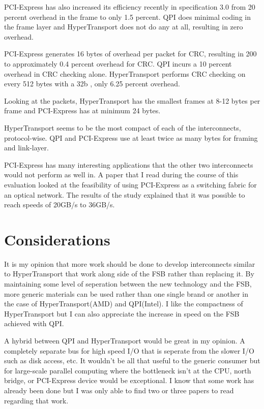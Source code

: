 \documentclass[conference]{IEEEtran}
\begin{document}
PCI-Express has also increased its efficiency recently in specification 3.0 from
20 percent overhead in the frame to only 1.5 percent. QPI does minimal coding in
the frame layer and HyperTransport does not do any at all, resulting in zero
overhead.

PCI-Express generates 16 bytes of overhead per packet for CRC, resulting in 200
to approximately 0.4 percent overhead for CRC. QPI incurs a 10
percent overhead in CRC checking alone. HyperTransport performs CRC checking on
every 512 bytes with a 32b , only 6.25 percent overhead. 

Looking at the packets, HyperTransport has the smallest frames at 8-12 bytes per
frame and PCI-Express has at minimum 24 bytes. 

HyperTransport seems to be the most compact of each of the interconnects,
protocol-wise. QPI and PCI-Express use at least twice as many bytes for framing
and link-layer. 

PCI-Express has many interesting applications that the other two interconnects
would not perform as well in. A paper that I read during the course of this
evaluation looked at the feasibility of using PCI-Express as a switching fabric
for an optical network. The results of the study explained that it was possible
to reach speeds of 20GB/s to 36GB/s.\cite{gray2007co}

\section{Considerations}
It is my opinion that more work should be done to develop interconnects similar
to HyperTransport that work along side of the FSB rather than replacing it.
By maintaining some level of seperation between the new technology and the FSB,
more generic materials can be used rather than one single brand or another in
the case of HyperTransport(AMD) and QPI(Intel). I like the compactness of
HyperTransport but I can also appreciate the increase in speed on the FSB
achieved with QPI. 

A hybrid between QPI and HyperTransport would be great in my opinion. A
completely separate bus for high speed I/O that is seperate from the slower I/O
such as disk access, etc. It wouldn't be all that useful to the generic consumer
but for large-scale parallel computing where the bottleneck isn't at the CPU,
north bridge, or PCI-Express device would be exceptional. I know that some work
has already been done but I was only able to find two or three papers to read
regarding that work. 
\end{document}
